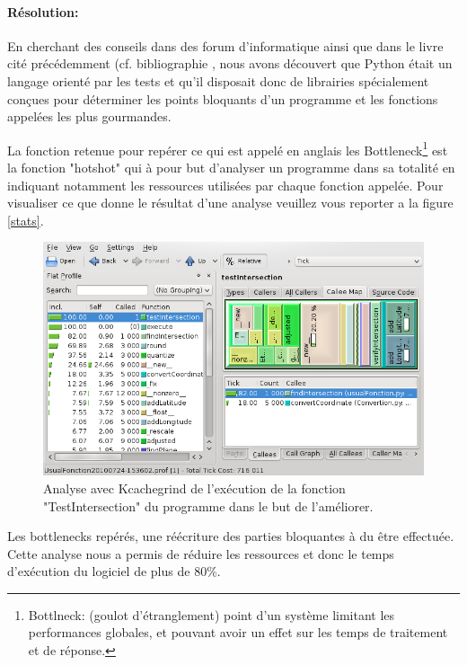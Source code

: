             \paragraph{Résolution:}
En cherchant des conseils dans des forum d'informatique ainsi que dans le livre cité précédemment (cf. bibliographie \cite{pybook}, nous avons découvert que Python était un langage orienté par les tests et qu'il disposait donc de librairies spécialement conçues pour déterminer les points bloquants d'un programme et les fonctions appelées les plus gourmandes.

La fonction retenue pour repérer ce qui est appelé en anglais les Bottleneck\footnote{Bottlneck: (goulot d'étranglement) point d'un système limitant les performances globales, et pouvant avoir un effet sur les temps de traitement et de réponse.} est la fonction "hotshot" qui à pour but d'analyser un programme dans sa totalité en indiquant notamment les ressources utilisées par chaque fonction appelée. Pour visualiser ce que donne le résultat d'une analyse veuillez vous reporter a la figure \vref{stats}.
\begin{figure}
\center
\includegraphics[width=15cm]{images/stats.png}
\caption{Analyse avec Kcachegrind de l'exécution de la fonction "TestIntersection" du programme dans le but de l'améliorer.}
\label{stats}
\end{figure}

Les bottlenecks repérés, une réécriture des parties bloquantes à du être effectuée. Cette analyse nous a permis de réduire les ressources et donc le temps d'exécution du logiciel de plus de 80\%.
